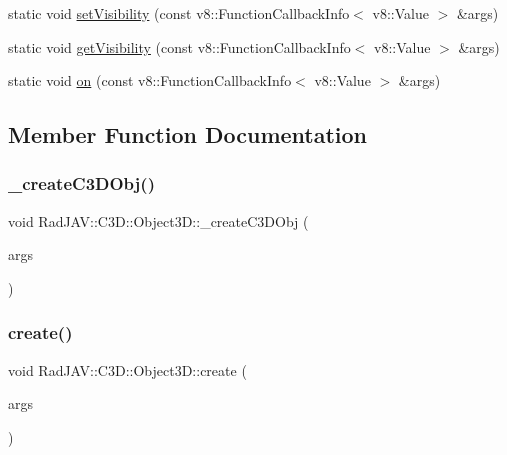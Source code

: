 \begin{DoxyCompactItemize}
\item 
static void \mbox{\hyperlink{class_rad_j_a_v_1_1_c3_d_1_1_object3_d_a4079425cb008b8d6b1bdebb265a74ffb}{set\+Visibility}} (const v8\+::\+Function\+Callback\+Info$<$ v8\+::\+Value $>$ \&args)
\item 
static void \mbox{\hyperlink{class_rad_j_a_v_1_1_c3_d_1_1_object3_d_a715f9ef0bcb724109d78d7f13f6fe3d8}{get\+Visibility}} (const v8\+::\+Function\+Callback\+Info$<$ v8\+::\+Value $>$ \&args)
\item 
static void \mbox{\hyperlink{class_rad_j_a_v_1_1_c3_d_1_1_object3_d_a4ee7aaf622cf5a9ce3b588dc998db1ca}{on}} (const v8\+::\+Function\+Callback\+Info$<$ v8\+::\+Value $>$ \&args)
\end{DoxyCompactItemize}


\subsection{Member Function Documentation}
\mbox{\label{class_rad_j_a_v_1_1_c3_d_1_1_object3_d_ad49751514d7d75a10ba14c621ec1f0a6}} 
\subsubsection{\texorpdfstring{\+\_\+create\+C3\+D\+Obj()}{\_createC3DObj()}}
{\footnotesize\ttfamily void Rad\+J\+A\+V\+::\+C3\+D\+::\+Object3\+D\+::\+\_\+create\+C3\+D\+Obj (\begin{DoxyParamCaption}\item[{const v8\+::\+Function\+Callback\+Info$<$ v8\+::\+Value $>$ \&}]{args }\end{DoxyParamCaption})\hspace{0.3cm}{\ttfamily [static]}}

\mbox{\label{class_rad_j_a_v_1_1_c3_d_1_1_object3_d_ac3a54ccff742410e86e36c09b6e21f2a}} 
\subsubsection{\texorpdfstring{create()}{create()}}
{\footnotesize\ttfamily void Rad\+J\+A\+V\+::\+C3\+D\+::\+Object3\+D\+::create (\begin{DoxyParamCaption}\item[{const v8\+::\+Function\+Callback\+Info$<$ v8\+::\+Value $>$ \&}]{args }\end{DoxyParamCaption})\hspace{0.3cm}{\ttfamily [static]}}

